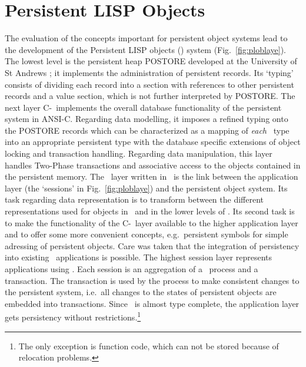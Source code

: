 \documentclass[a4paper%
]{article}
\newcommand\showfigrule{0pt}
\renewcommand\figurename{Fig.}
\begin{document}
\section{Persistent LISP Objects}
%
\begin{figwindow}[2,r,{\rule{\showfigrule}{9.5\baselineskip}%
                       \psfig{figure=tenpt/ploblaye.eps}},
                  {\plob\ layers%
                   \label{fig:ploblaye}}]
%
\noindent%
The evaluation of the concepts important for persistent object systems
lead to the development of the Persistent LISP objects (\plob) system
(\figurename~\ref{fig:ploblaye}). The lowest level is the persistent
heap POSTORE developed at the University of St Andrews
\cite{bib:br92}; it implements the administration of persistent
records. Its `typing' consists of dividing each record into a section
with references to other persistent records and a value section, which
is not further interpreted by POSTORE.
%
The next layer C-\plob\ implements the overall database functionality
of the persistent system in ANSI-C. Regarding data modelling, it
imposes a refined typing onto the POSTORE records which can be
characterized as a mapping of \emph{each} \clos\ type into an
appropriate persistent type with the database specific extensions of
object locking and transaction handling. Regarding data manipulation,
this layer handles Two-Phase transactions and associative access to
the objects contained in the persistent memory.
%
The \plob\ layer written in \clos\ is the link between the application
layer (the `sessions' in \figurename~\ref{fig:ploblaye}) and the
persistent object system. Its task regarding data representation is to
transform between the different representations used for objects in
\clos\ and in the lower levels of \plob.
Its second task is to make the functionality of the C-\plob\ layer
available to the higher application layer and to offer some more
convenient concepts, e.g.\ persistent symbols for simple adressing of
persistent objects. Care was taken that the integration of persistency
into existing \clos\ applications is possible.
%
The highest session layer represents applications using \plob. Each
session is an aggregation of a \clos\ process and a transaction. The
transaction is used by the process to make consistent changes to the
persistent system, i.e.\ all changes to the states of persistent
objects are embedded into transactions. Since \plob\ is almost type
complete, the application layer gets persistency without
restrictions.\footnote{The only exception is function code, which can
not be stored because of relocation problems.}
\end{figwindow}
%
\end{document}
